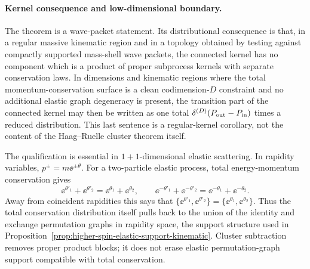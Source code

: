 \paragraph{Kernel consequence and low-dimensional boundary.}
The theorem is a wave-packet statement.  Its distributional consequence is
that, in a regular massive kinematic region and in a topology obtained by
testing against compactly supported mass-shell wave packets, the connected
kernel has no component which is a product of proper subprocess kernels with
separate conservation laws.  In dimensions and kinematic regions where the
total momentum-conservation surface is a clean codimension-\(D\) constraint
and no additional elastic graph degeneracy is present, the transition part of
the connected kernel may then be written as one total
\(\delta^{(D)}(P_{\rm out}-P_{\rm in})\) times a reduced distribution.  This
last sentence is a regular-kernel corollary, not the content of the
Haag--Ruelle cluster theorem itself.

The qualification is essential in \(1+1\)-dimensional elastic scattering.  In
rapidity variables, \(p^\pm=m\ee^{\pm\theta}\).  For a two-particle elastic
process, total energy-momentum conservation gives
\[
  \ee^{\theta'_1}+\ee^{\theta'_2}
  =
  \ee^{\theta_1}+\ee^{\theta_2},
  \qquad
  \ee^{-\theta'_1}+\ee^{-\theta'_2}
  =
  \ee^{-\theta_1}+\ee^{-\theta_2}.
\]
Away from coincident rapidities this says that
\(\{\ee^{\theta'_1},\ee^{\theta'_2}\}
=\{\ee^{\theta_1},\ee^{\theta_2}\}\).  Thus the total conservation
distribution itself pulls back to the union of the identity and exchange
permutation graphs in rapidity space, the support structure used in
Proposition~\ref{prop:higher-spin-elastic-support-kinematic}.  Cluster
subtraction removes proper product blocks; it does not erase elastic
permutation-graph support compatible with total conservation.

\begin{center}
\end{center}

